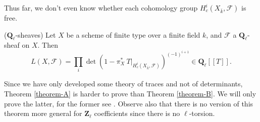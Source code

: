 \noindent
Thus far, we don't even know whether each cohomology group
$H^i_c(X_{\bar k}, \mathcal{F})$ is free.

\begin{theorem}
\label{theorem-B}
($\mathbf{Q}_\ell$-sheaves)
Let $X$ be a scheme of finite type over a finite field $k$, and $\mathcal{F}$ a
$\mathbf{Q}_\ell$-sheaf on $X$. Then
$$
L(X, \mathcal{F}) = \prod_i \det\left(1-\pi_X^*\
T\Big|_{H_c^i\left(X_{\bar k} , \mathcal{F}\right)}\right)^{(-1)^{i+1}}
\in \mathbf{Q}_\ell[[ T]].
$$
\end{theorem}

\begin{remark}
\label{remark-which-is-harder}
Since we have only developed some theory of traces and not of determinants,
Theorem \ref{theorem-A} is harder to prove than Theorem \ref{theorem-B}.
We will only prove the latter, for the former see \cite{SGA4.5}.
Observe also that there is no version of this theorem more general for
$\mathbf{Z}_\ell$ coefficients since there is no $\ell$-torsion.
\end{remark}

